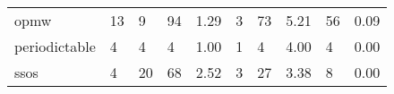 \begin{tabular}{llllllllll}
opmw                        &                         13 &                          9 &              94 &           1.29 &              3 &                73 &             5.21 &               56 &         0.09 \\
periodictable               &                          4 &                          4 &               4 &           1.00 &              1 &                 4 &             4.00 &                4 &         0.00 \\
ssos                        &                          4 &                         20 &              68 &           2.52 &              3 &                27 &             3.38 &                8 &         0.00 \\
\bottomrule
\end{tabular}

